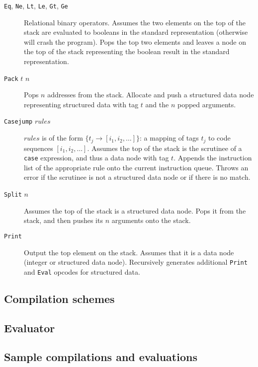 \begin{description}
\item[\texttt{Eq}, \texttt{Ne}, \texttt{Lt}, \texttt{Le}, \texttt{Gt}, \texttt{Ge}] Relational binary operators. Assumes the two elements on the top of the stack are evaluated to booleans in the standard representation (otherwise will crash the program). Pops the top two elements and leaves a node on the top of the stack representing the boolean result in the standard representation.
\item[\texttt{Pack} $t$ $n$] Pops $n$ addresses from the stack. Allocate and push a structured data node representing structured data with tag $t$ and the $n$ popped arguments.
\item[\texttt{Casejump} $rules$] $rules$ is of the form $\{t_j\to [i_1,i_2,\dots]\}$: a mapping of tags $t_j$ to code sequences $[i_1,i_2,\dots]$. Assumes the top of the stack is the scrutinee of a \texttt{case} expression, and thus a data node with tag $t$. Appends the instruction list of the appropriate rule onto the current instruction queue. Throws an error if the scrutinee is not a structured data node or if there is no match.
\item[\texttt{Split} $n$] Assumes the top of the stack is a structured data node. Pops it from the stack, and then pushes its $n$ arguments onto the stack.
\item[\texttt{Print}] Output the top element on the stack. Assumes that it is a data node (integer or structured data node). Recursively generates additional \texttt{Print} and \texttt{Eval} opcodes for structured data.

\end{description}

\subsection{Compilation schemes}
\label{sec:compilation-schemes}


\subsection{Evaluator}
\label{sec:evaluator}


\subsection{Sample compilations and evaluations}
\label{sec:compiler-examples}

